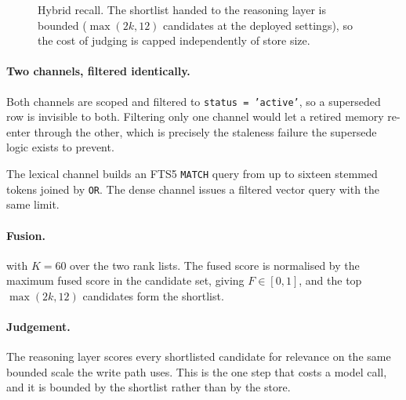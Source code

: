 \documentclass[10pt,twocolumn]{article}
\begin{document}
\begin{figure}[t]
\centering
{}
\caption{Hybrid recall. The shortlist handed to the reasoning layer is bounded
($\max(2k,12)$ candidates at the deployed settings), so the cost of judging is
capped independently of store size.}
\label{fig:recall}
\end{figure}

\paragraph{Two channels, filtered identically.}
Both channels are scoped and filtered to \texttt{status = 'active'}, so a
superseded row is invisible to both. Filtering only one channel would let a
retired memory re-enter through the other, which is precisely the staleness
failure the supersede logic exists to prevent.

The lexical channel builds an FTS5 \texttt{MATCH} query from up to sixteen
stemmed tokens joined by \texttt{OR}. The dense channel issues a filtered
vector query with the same limit.

\paragraph{Fusion.}
 with $K=60$ over the two rank lists. The fused score is
normalised by the maximum fused score in the candidate set, giving
$F\in[0,1]$, and the top $\max(2k,12)$ candidates form the shortlist.

\paragraph{Judgement.}
The reasoning layer scores every shortlisted candidate for relevance on the same
bounded scale the write path uses. This is the one step that costs a model call,
and it is bounded by the shortlist rather than by the store.
\end{document}
